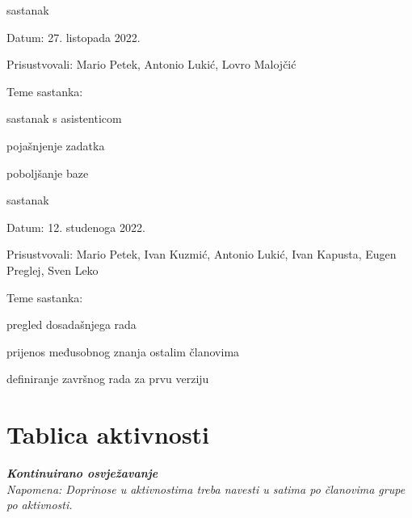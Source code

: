 \begin{packed_enum}
			\item  sastanak
			\item[] \begin{packed_item}
				\item Datum: 27. listopada 2022.
				\item Prisustvovali: Mario Petek, Antonio Lukić, Lovro Malojčić
				\item Teme sastanka:
				\begin{packed_item}
					\item  sastanak s asistenticom
					\item  pojašnjenje zadatka
					\item  poboljšanje baze
				\end{packed_item}
			\end{packed_item}
		
			\item  sastanak
			\item[] \begin{packed_item}
				\item Datum: 12. studenoga 2022.
				\item Prisustvovali: Mario Petek, Ivan Kuzmić, Antonio Lukić, Ivan Kapusta, Eugen Preglej, Sven Leko
				\item Teme sastanka:
				\begin{packed_item}
					\item  pregled dosadašnjega rada
					\item  prijenos međusobnog znanja ostalim članovima
					\item  definiranje završnog rada za prvu verziju
				\end{packed_item}
			\end{packed_item}
			
			
			
		\end{packed_enum}
		
		\eject
		\section*{Tablica aktivnosti}
		
			\textbf{\textit{Kontinuirano osvježavanje}}\\
			
			 \textit{Napomena: Doprinose u aktivnostima treba navesti u satima po članovima grupe po aktivnosti.}


